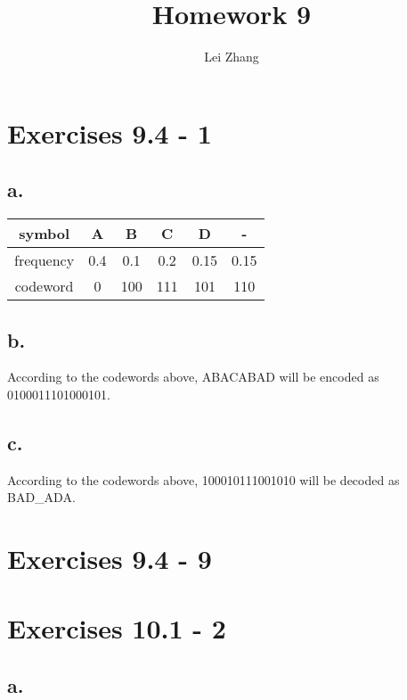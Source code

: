 \documentclass{article}
\title{Homework 9}
\author{Lei Zhang}
\begin{document}
\maketitle

\section{Exercises 9.4 - 1}

\subsection*{a.}

\clearpage

\begin{tabular}{c|ccccc}
  symbol & A & B & C & D & - \\
  \hline
  frequency & 0.4 & 0.1 & 0.2 & 0.15 & 0.15 \\
  codeword & 0 & 100 & 111 & 101 & 110 \\
\end{tabular}

\subsection*{b.}

According to the codewords above, ABACABAD will be encoded as 0100011101000101.

\subsection*{c.}

According to the codewords above, 100010111001010 will be decoded as BAD\_ADA.

\section{Exercises 9.4 - 9}

\clearpage

\section{Exercises 10.1 - 2}

\subsection*{a.}

\bigbreak

\bigbreak
\end{document}
